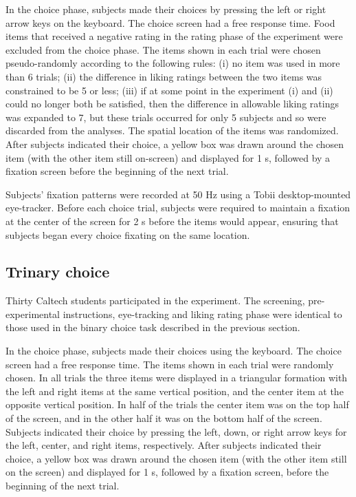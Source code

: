 In the choice phase, subjects made their choices by pressing the left or right arrow keys on the keyboard. The choice screen had a free response time. Food items that received a negative rating in the rating phase of the experiment were excluded from the choice phase. The items shown in each trial were chosen pseudo-randomly according to the following rules: (i) no item was used in more than 6 trials; (ii) the difference in liking ratings between the two items was constrained to be 5 or less; (iii) if at some point in the experiment (i) and (ii) could no longer both be satisfied, then the difference in allowable liking ratings was expanded to 7, but these trials occurred for only 5 subjects and so were discarded from the analyses. The spatial location of the items was randomized. After subjects indicated their choice, a yellow box was drawn around the chosen item (with the other item still on-screen) and displayed for 1 s, followed by a fixation screen before the beginning of the next trial.

Subjects’ fixation patterns were recorded at 50 Hz using a Tobii desktop-mounted eye-tracker. Before each choice trial, subjects were required to maintain a fixation at the center of the screen for 2 s before the items would appear, ensuring that subjects began every choice fixating on the same location.


\subsection{Trinary choice}

Thirty Caltech students participated in the experiment. The screening, pre-experimental instructions, eye-tracking and liking rating phase were identical to those used in the binary choice task described in the previous section.

In the choice phase, subjects made their choices using the keyboard. The choice screen had a free response time. The items shown in each trial were randomly chosen. In all trials the three items were displayed in a triangular formation with the left and right items at the same vertical position, and the center item at the opposite vertical position. In half of the trials the center item was on the top half of the screen, and in the other half it was on the bottom half of the screen. Subjects indicated their choice by pressing the left, down, or right arrow keys for the left, center, and right items, respectively. After subjects indicated their choice, a yellow box was drawn around the chosen item (with the other item still on the screen) and displayed for 1 s, followed by a fixation screen, before the beginning of the next trial.


